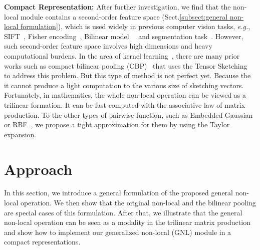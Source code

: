 \documentclass{article}
\begin{document}
\textbf{Compact Representation:}
After further investigation, we find that the non-local module contains a second-order feature space (Sect.\ref{subsect:general non-local formulation}), which is used widely in previous computer vision tasks, \textit{e.g.}, SIFT~\cite{sift}, Fisher encoding~\cite{fisher}, Bilinear model~\cite{bilinear}~\cite{cbp} and segmentation task~\cite{order2_seg}.
However, such second-order feature space involves high dimensions and heavy computational burdens.
In the area of kernel learning~\cite{scholkopf2001learning}, there are many prior works such as compact bilinear pooling (CBP)~\cite{cbp} that uses the Tensor Sketching~\cite{tensor-sketching} to address this problem.
But this type of method is not perfect yet.
Because the it cannot produce a light computation to the various size of sketching vectors.
Fortunately, in mathematics, the whole non-local operation can be viewed as a trilinear formation.
It can be fast computed with the associative law of matrix production.
To the other types of pairwise function, such as Embedded Gaussian or RBF~\cite{rbf}, we propose a tight approximation for them by using the Taylor expansion.
%
%
\section{Approach}
In this section, we introduce a general formulation of the proposed general non-local operation.
We then show that the original non-local and the bilinear pooling are special cases of this formulation.
After that, we illustrate that the general non-local operation can be seen as a modality in the trilinear matrix production and show how to implement our generalized non-local (GNL) module in a compact representations.
%
%
\end{document}
